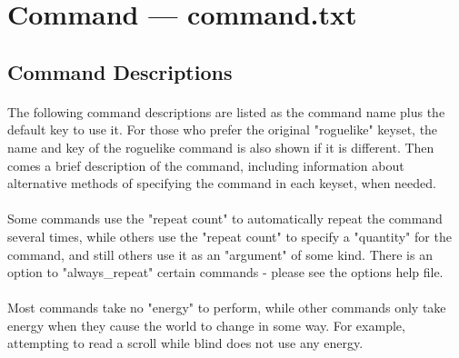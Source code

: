 \section{Command --- command.txt}
\subsection{Command Descriptions} 
\paragraph{}The following command
descriptions are listed as the command name plus the default key to use
it. For those who prefer the original "roguelike" keyset, the name and
key of the roguelike command is also shown if it is different. Then
comes a brief description of the command, including information about
alternative methods of specifying the command in each keyset, when
needed.

\paragraph{}Some commands use the "repeat count" to automatically repeat
the command several times, while others use the "repeat count" to
specify a "quantity" for the command, and still others use it as an
"argument" of some kind. There is an option to "always\_repeat" certain
commands - please see the options help file.

\paragraph{}Most commands take no "energy" to perform, while other
commands only take energy when they cause the world to change in some
way. For example, attempting to read a scroll while blind does not use
any energy.

